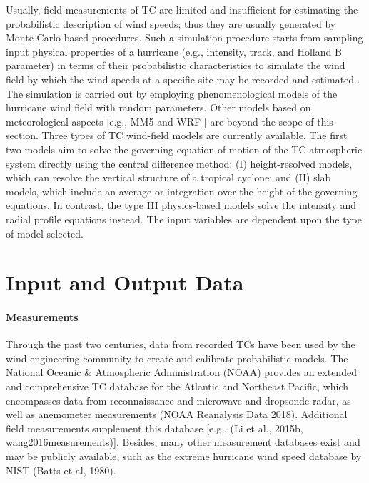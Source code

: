 Usually, field measurements of TC are limited and insufficient for estimating the probabilistic description of wind speeds; thus they are usually generated by Monte Carlo-based procedures. Such a simulation procedure starts from sampling input physical properties of a hurricane (e.g., intensity, track, and Holland B parameter) in terms of their probabilistic characteristics to simulate the wind field by which the wind speeds at a specific site may be recorded and estimated \citep{russell1969probability}. The simulation is carried out by employing phenomenological models of the hurricane wind field with random parameters. Other models based on meteorological aspects [e.g., MM5 \citep{liu1997multiscale} and WRF \citep{davis2008prediction}] are beyond the scope of this section. Three types of TC wind-field models are currently available. The first two models aim to solve the governing equation of motion of the TC atmospheric system directly using the central difference method: (I) height-resolved models, which can resolve the vertical structure of a tropical cyclone; and (II) slab models, which include an average or integration over the height of the governing equations. In contrast, the type III physics-based models solve the intensity and radial profile equations instead. The input variables are dependent upon the type of model selected.

\section{Input and Output Data}
\label{sec:storm_wind_io}

\paragraph{Measurements} Through the past two centuries, data from recorded TCs have been used by the wind engineering community to create and calibrate probabilistic models. The National Oceanic \& Atmospheric Administration (NOAA) provides an extended and comprehensive TC database for the Atlantic and Northeast Pacific, which encompasses data from reconnaissance and microwave and dropsonde radar, as well as anemometer measurements (NOAA Reanalysis Data 2018). Additional field measurements supplement this database [e.g., (Li et al., 2015b, wang2016measurements)]. Besides, many other measurement databases exist and may be publicly available, such as the extreme hurricane wind speed database by NIST (Batts et al, 1980).


